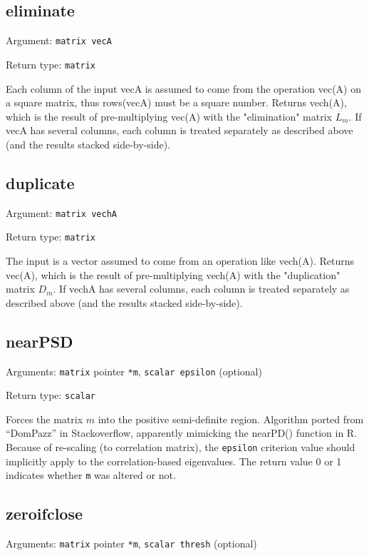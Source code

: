 \documentclass[11pt,english]{article}
\begin{document}
\subsection{eliminate}

Argument: \texttt{matrix vecA}

\noindent Return type: \texttt{matrix}

Each column of the input vecA is assumed to come from the operation vec(A) 
on a square matrix, thus rows(vecA) must be a square number.
Returns vech(A), which is the result of pre-multiplying vec(A) with the 
"elimination" matrix $L_m$.
If vecA has several columns, each column is 
treated separately as described above (and the results stacked side-by-side).

\subsection{duplicate}

Argument: \texttt{matrix vechA}

\noindent Return type: \texttt{matrix}

The input is a vector assumed to come from an operation like vech(A).
Returns vec(A), which is the result of pre-multiplying vech(A) with the 
"duplication" matrix $D_m$. If vechA has several columns, each column is 
treated separately as described above (and the results stacked side-by-side).

\subsection{nearPSD}

Arguments: \texttt{matrix} pointer \texttt{{*}m}, \texttt{scalar epsilon}
(optional) 

\noindent Return type: \texttt{scalar}

Forces the matrix $m$ into the positive semi-definite region. Algorithm
ported from ``DomPazz'' in Stackoverflow,
apparently mimicking the nearPD() function in R. Because of re-scaling
(to correlation matrix), the \texttt{epsilon} criterion value should
implicitly apply to the correlation-based eigenvalues. The return
value 0 or 1 indicates whether \texttt{m} was altered or not. 

\subsection{zeroifclose}

Arguments: \texttt{matrix} pointer \texttt{{*}m}, \texttt{scalar thresh}
(optional) 
\end{document}
